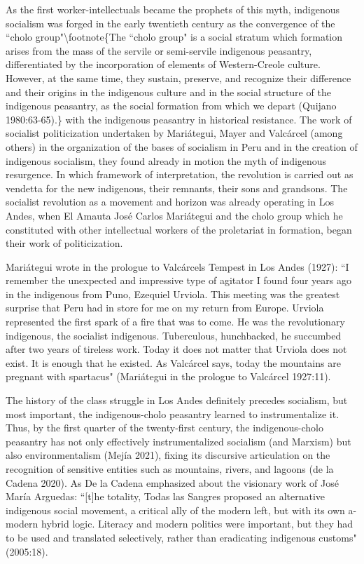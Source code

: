 \documentclass[
]{article}
\begin{document}
As the first worker-intellectuals became the prophets of this myth,
indigenous socialism was forged in the early twentieth century as the
convergence of the ``cholo group"\textbackslash footnote\{The ``cholo
group" is a social stratum which formation arises from the mass of the
servile or semi-servile indigenous peasantry, differentiated by the
incorporation of elements of Western-Creole culture. However, at the
same time, they sustain, preserve, and recognize their difference and
their origins in the indigenous culture and in the social structure of
the indigenous peasantry, as the social formation from which we depart
(Quijano 1980:63-65).\} with the indigenous peasantry in historical
resistance. The work of socialist politicization undertaken by
Mariátegui, Mayer and Valcárcel (among others) in the organization of
the bases of socialism in Peru and in the creation of indigenous
socialism, they found already in motion the myth of indigenous
resurgence. In which framework of interpretation, the revolution is
carried out as vendetta for the new indigenous, their remnants, their
sons and grandsons. The socialist revolution as a movement and horizon
was already operating in Los Andes, when El Amauta José Carlos
Mariátegui and the cholo group which he constituted with other
intellectual workers of the proletariat in formation, began their work
of politicization.

Mariátegui wrote in the prologue to Valcárcel\textquotesingle s Tempest
in Los Andes (1927): ``I remember the unexpected and impressive type of
agitator I found four years ago in the indigenous from Puno, Ezequiel
Urviola. This meeting was the greatest surprise that Peru had in store
for me on my return from Europe. Urviola represented the first spark of
a fire that was to come. He was the revolutionary indigenous, the
socialist indigenous. Tuberculous, hunchbacked, he succumbed after two
years of tireless work. Today it does not matter that Urviola does not
exist. It is enough that he existed. As Valcárcel says, today the
mountains are pregnant with spartacus" (Mariátegui in the prologue to
Valcárcel 1927:11).

The history of the class struggle in Los Andes definitely precedes
socialism, but most important, the indigenous-cholo peasantry learned to
instrumentalize it. Thus, by the first quarter of the twenty-first
century, the indigenous-cholo peasantry has not only effectively
instrumentalized socialism (and Marxism) but also environmentalism
(Mejía 2021), fixing its discursive articulation on the recognition of
sensitive entities such as mountains, rivers, and lagoons (de la Cadena
2020). As De la Cadena emphasized about the visionary work of José María
Arguedas: ``{[}t{]}he totality, Todas las Sangres proposed an
alternative indigenous social movement, a critical ally of the modern
left, but with its own a-modern hybrid logic. Literacy and modern
politics were important, but they had to be used and translated
selectively, rather than eradicating indigenous customs" (2005:18).
\end{document}
